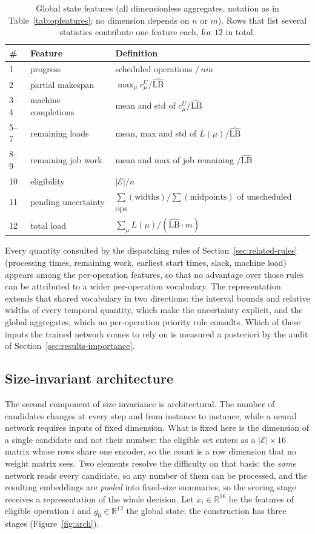 \documentclass[preprint,authoryear,12pt]{elsarticle}
\newcommand{\LBi}{\widehat{\mathrm{LB}}}
\theoremstyle{definition}
\theoremstyle{remark}
\begin{document}
\begin{table}[!htb]
\centering\small
\caption{Global state features (all dimensionless aggregates,
notation as in Table~\ref{tab:opfeatures}; no dimension depends on
$n$ or $m$). Rows that list several statistics contribute one feature
each, for $12$ in total.}
\label{tab:globalfeatures}
\begin{tabular*}{\textwidth}{@{\extracolsep{\fill}}lll}
\toprule
\# & Feature & Definition \\
\midrule
1 & progress & scheduled operations $/\,nm$ \\
2 & partial makespan & $\max_\mu c^U_\mu / \LBi$ \\
3--4 & machine completions & mean and std of $c^U_\mu/\LBi$ \\
5--7 & remaining loads & mean, max and std of $L(\mu)/\LBi$ \\
8--9 & remaining job work & mean and max of job remaining $/\LBi$ \\
10 & eligibility & $|\mathcal{E}|/n$ \\
11 & pending uncertainty & $\sum(\text{widths})/\sum(\text{midpoints})$ of
unscheduled ops \\
12 & total load & $\sum_\mu L(\mu)/(\LBi\cdot m)$ \\
\bottomrule
\end{tabular*}
\end{table}

Every quantity consulted by the dispatching rules of
Section~\ref{sec:related-rules} (processing times, remaining work,
earliest start times, slack, machine load) appears among the
per-operation features, so that no advantage over those rules can be
attributed to a wider per-operation vocabulary. The representation
extends that shared vocabulary in two directions: the interval
bounds and relative widths of every temporal quantity, which make the
uncertainty explicit, and the global aggregates, which no
per-operation priority rule consults. Which of these inputs the
trained network comes to rely on is measured a posteriori by the
audit of Section~\ref{sec:results-importance}.

\FloatBarrier
\subsection{Size-invariant architecture}
\label{sec:arch}

The second component of size invariance is architectural. The number
of candidates changes at every step and from instance to instance,
while a neural network requires inputs of fixed dimension. What is
fixed here is the dimension of a single candidate and not their
number: the eligible set enters as a $|\mathcal{E}|\times16$ matrix
whose rows share one encoder, so the count is a row dimension that no
weight matrix sees. Two elements resolve the difficulty on that
basis: the \emph{same} network reads every candidate, so any number
of them can be processed, and the resulting embeddings are
\emph{pooled} into fixed-size summaries, so the scoring stage
receives a representation of the whole decision. Let
$x_i\in\mathbb{R}^{16}$ be the features of eligible operation $i$ and
$g_0\in\mathbb{R}^{12}$ the global state; the construction has
three stages (Figure~\ref{fig:arch}).
\end{document}
